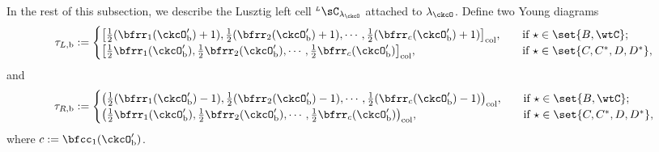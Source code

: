 \documentclass[12pt,a4paper]{amsart}
\numberwithin{equation}{section}
\theoremstyle{remark}
\def\half{{\tfrac{1}{2}}}
\def\LC{{}^{\scriptscriptstyle L}\sC}
\begin{document}
  In the rest of this subsection, we describe the Lusztig left cell $\LC_{\lambda_{\ckcO}}$
  attached to $\lambda_{\ckcO}$.
 Define two Young diagrams
 \begin{equation}\label{eq:taub}
    \begin{split}
      \tau_{L,\mathrm b} := \begin{cases}
        \big[\half(\bfrr_{1}(\ckcO'_{\mathrm b})+1), \half(\bfrr_{2}(\ckcO'_{\mathrm b})+1), \cdots, \half(\bfrr_{c}(\ckcO'_{\mathrm b})+1)\big]_{\mathrm{col}},
               &\quad \text{if } \star \in \set{B,\wtC}; \\%
         \big[\half\bfrr_{1}(\ckcO'_{\mathrm b}), \half\bfrr_{2}(\ckcO'_{\mathrm b}),\cdots, \half\bfrr_{c}(\ckcO'_{\mathrm b})\big]_{\mathrm{col}},
        &\quad  \text{if } \star \in \set{C,C^{*}, D,D^{*}},\\
      \end{cases}
    \end{split}
  \end{equation}
  and
   \begin{equation}\label{eq:taub2}
    \begin{split}
      \tau_{R,\mathrm b} := \begin{cases}
        \big(\half(\bfrr_{1}(\ckcO'_{\mathrm b})-1), \half(\bfrr_{2}(\ckcO'_{\mathrm b})-1), \cdots, \half(\bfrr_{c}(\ckcO'_{\mathrm b})-1)\big)_{\mathrm{col}},
               &\quad \text{if } \star \in \set{B,\wtC}; \\%
         \big(\half\bfrr_{1}(\ckcO'_{\mathrm b}), \half\bfrr_{2}(\ckcO'_{\mathrm b}),\cdots, \half\bfrr_{c}(\ckcO'_{\mathrm b})\big)_{\mathrm{col}},
        &\quad  \text{if } \star \in \set{C,C^{*}, D,D^{*}},\\
      \end{cases}
    \end{split}
  \end{equation}
 where $c:= \bfcc_{1}(\ckcO'_{\mathrm b})$.
\end{document}
